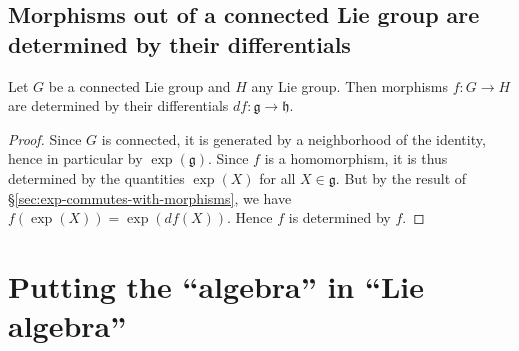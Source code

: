 \documentclass[reqno]{amsart} 
\begin{document}
\subsection{Morphisms out of a connected Lie group are determined by their differentials}
\label{sec:org84c10f5}
\begin{theorem}
  Let $G$ be a connected Lie group
  and $H$ any Lie group.
  Then morphisms $f : G \rightarrow H$
  are determined by their differentials
  $d f : \mathfrak{g} \rightarrow \mathfrak{h}$.
\end{theorem}
\begin{proof}
  Since $G$ is connected,
  it is generated by a neighborhood
  of the identity, hence in particular
  by $\exp(\mathfrak{g})$.
  Since $f$ is a homomorphism,
  it is thus determined
  by the quantities $\exp(X)$ for all $X \in \mathfrak{g}$.
  But by the result of \S\ref{sec:exp-commutes-with-morphisms},
  we have
  $f(\exp(X)) = \exp(d f(X))$.
  Hence $f$ is determined by $f$.
\end{proof}

\section{Putting the ``algebra'' in ``Lie algebra''}
\label{sec:org03a946d}
\end{document}
